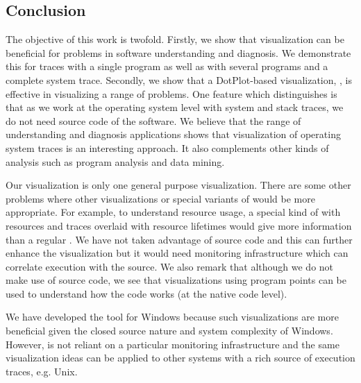 \subsection{Conclusion}
\label{sec:conclusion}

The objective of this work is twofold.
Firstly, we show that visualization can be beneficial for problems
in software understanding and diagnosis. We demonstrate this
for traces with a single program as well as with
several programs and a complete system trace.
Secondly, we show that a DotPlot-based visualization, \VDP{}, is effective
in visualizing a range of problems.
One feature which distinguishes \lviz{} is that as we work
at the operating system level with system and stack traces, 
we do not need source code of the software.
We believe that the range of understanding and diagnosis applications
shows that visualization of operating system traces is an interesting approach.
It also complements other kinds of analysis such
as program analysis and data mining.

Our \VDP{} visualization is only one general purpose visualization.
There are some other problems where other visualizations \cite{wu2010comprehending} or special
variants of \VDP{} would be more appropriate. For example, to understand
resource usage, a special kind of \VDP{} with resources and traces overlaid
with resource lifetimes would give more information than a regular \VDP{}.
We have not taken advantage of source code and this can further enhance
the visualization but it would need monitoring infrastructure which
can correlate execution with the source.
We also remark that although we do not make use of source code, we
see that visualizations using program points can be used to understand 
how the code works (at the native code level).

We have developed the \VDP{} tool for Windows because such visualizations
are more beneficial given the closed source nature and system complexity
of Windows. 
However, \VDP{} is not reliant on a particular monitoring 
infrastructure and the same visualization ideas can be applied
to other systems with a rich source of execution traces, e.g. Unix.
